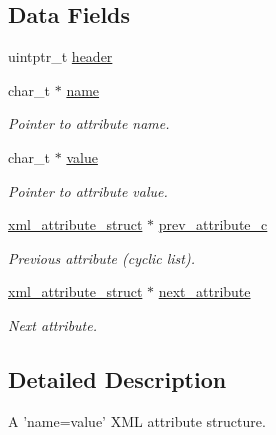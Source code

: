 \subsection*{Data Fields}
\begin{DoxyCompactItemize}
\item 
uintptr\_\-t \hyperlink{structpugi_1_1xml__attribute__struct_a0dca6ca6c129bbf87a7ebaf87f3e12de}{header}
\item 
char\_\-t $\ast$ \hyperlink{structpugi_1_1xml__attribute__struct_aa886c4aae23a132e1704717721ee2c19}{name}
\begin{DoxyCompactList}\small\item\em Pointer to attribute name. \item\end{DoxyCompactList}\item 
char\_\-t $\ast$ \hyperlink{structpugi_1_1xml__attribute__struct_ae652627d56cb9dcc0afdd1fbf6570364}{value}
\begin{DoxyCompactList}\small\item\em Pointer to attribute value. \item\end{DoxyCompactList}\item 
\hyperlink{structpugi_1_1xml__attribute__struct}{xml\_\-attribute\_\-struct} $\ast$ \hyperlink{structpugi_1_1xml__attribute__struct_a0e3a022235b316e4cfc1034ceb7d7862}{prev\_\-attribute\_\-c}
\begin{DoxyCompactList}\small\item\em Previous attribute (cyclic list). \item\end{DoxyCompactList}\item 
\hyperlink{structpugi_1_1xml__attribute__struct}{xml\_\-attribute\_\-struct} $\ast$ \hyperlink{structpugi_1_1xml__attribute__struct_a9860c0eb7fa72dc9b69ee9b0575f9efc}{next\_\-attribute}
\begin{DoxyCompactList}\small\item\em Next attribute. \item\end{DoxyCompactList}\end{DoxyCompactItemize}


\subsection{Detailed Description}
A 'name=value' XML attribute structure. 

